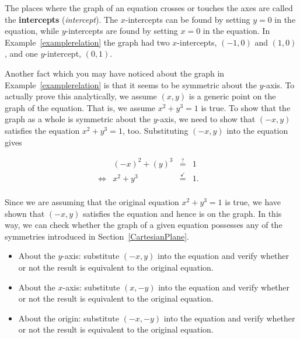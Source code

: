 The places where the graph of an equation crosses or touches the axes are called the \textbf{intercepts} (\textit{intercept}).   \ifvc The $x$-intercepts can be found by setting $y = 0$ in the equation, while $y$-intercepts are found by setting $x = 0$ in the equation.  In Example~\ref{examplerelation} the graph had two $x$-intercepts, $(-1,0)$ and $(1,0)$, and one $y$-intercept, $(0,1)$. \fi 

Another fact which you may have noticed about the graph in Example~\ref{examplerelation} is that it seems to be symmetric about the $y$-axis.  To actually prove this analytically, we assume $(x,y)$ is a generic point on the graph of the equation. That is, we assume  $x^2 + y^3 = 1$ is true. To show that the graph as a whole is symmetric about the $y$-axis, we need to show that $(-x,y)$ satisfies the equation $x^2 + y^3 = 1$, too.  Substituting $(-x,y)$ into the equation gives

\setlength{\extrarowheight}{2pt}

\[ \begin{array}{rrclr}   
&(-x)^2+(y)^3 & \stackrel{?}{=} & 1 & \\
\Leftrightarrow &  x^2 + y^3 & \stackrel{\checkmark}{=} & 1. & \\ 
   \end{array} \]
   
Since we are assuming that the original equation $x^2 + y^3 = 1$ is true, we have shown that $(-x, y)$ satisfies the equation and hence is on the graph.  In this way, we can check whether the graph of a given equation possesses any of the symmetries introduced in Section~\ref{CartesianPlane}.  



\begin{itemize}
	
	\item About the $y$-axis: substitute $(-x,y)$ into the equation and verify whether or not the result is equivalent to the original equation.
	
	\item About the $x$-axis: substitute $(x,-y)$ into the equation   and verify whether or not the result is equivalent to the original equation.
	
	\item About the origin: substitute $(-x,-y)$ into the equation and verify whether or not the result is equivalent to the original equation.
	
\end{itemize}


